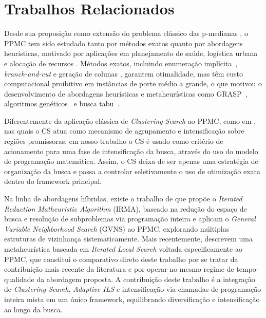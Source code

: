 \documentclass[a4paper,11pt]{article}
\begin{document}
\section{Trabalhos Relacionados}
\label{secRelated}

Desde sua proposição como extensão do problema clássico das p-medianas \cite{hakimi1964optimum}, o PPMC tem sido estudado tanto por métodos exatos quanto por abordagens heurísticas, motivado por aplicações em planejamento de saúde, logística urbana e alocação de recursos \citep{revelle1996plant, drezner1996facility}. Métodos exatos, incluindo enumeração implícita~\cite{mulvey1984solving}, \textit{branch-and-cut} e geração de colunas \cite{lorena2004column, ceselli2005branch, boccia2008cut}, garantem otimalidade, mas têm custo computacional proibitivo em instâncias de porte médio a grande, o que motivou o desenvolvimento de abordagens heurísticas e metaheurísticas como GRASP~\cite{resende2002grasp}, algoritmos genéticos~\cite{correa2004genetic} e busca
tabu~\cite{osman1994capacitated}.

Diferentemente da aplicação clássica de \textit{Clustering Search} ao 
PPMC, como em \cite{chaves2008clustering}, nas quais o CS atua como mecanismo de agrupamento e intensificação sobre regiões promissoras, em nosso trabalho o CS é usado como critério de acionamento para uma fase de intensificação da busca, através do uso do modelo de programação matemática. Assim, o CS deixa de ser apenas uma estratégia de organização da busca e passa a controlar seletivamente o uso de otimização exata dentro do framework principal.

Na linha de abordagens híbridas, existe o trabalho de \cite{stefanello2015matheuristics} que propõe o \textit{Iterated Reduction Matheuristic Algorithm} (IRMA), baseado na redução do espaço de busca e resolução de subproblemas via programação inteira e \cite{vasconcelos2021algoritmo} aplicam o \textit{General Variable Neighborhood Search} (GVNS) ao PPMC, explorando múltiplas
estruturas de vizinhança sistematicamente. Mais recentemente, \cite{freitas2025ils_pmediana} descrevem uma metaheurística baseada em \textit{Iterated Local Search} voltada especificamente ao PPMC, que constitui o comparativo direto deste trabalho por se tratar da contribuição mais recente da literatura e por operar no mesmo regime de tempo-qualidade da abordagem proposta. A contribuição deste trabalho é a integração de \textit{Clustering Search}, \textit{Adaptive ILS} e intensificação via chamadas de programação inteira mista em um único framework, equilibrando diversificação e intensificação ao longo da busca.
\end{document}

